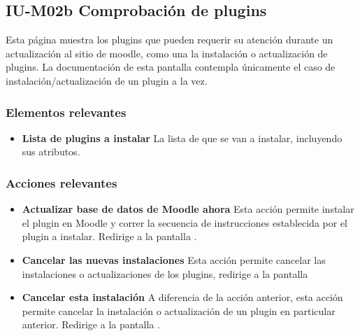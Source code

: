 
\subsection{IU-M02b Comprobación de plugins}

 Esta página muestra los plugins que pueden requerir su atención durante un actualización al sitio
 de moodle, como una la instalación o actualización de plugins. La documentación de esta pantalla
 contempla únicamente el caso de instalación/actualización de un plugin a la vez.


\subsubsection{Elementos relevantes}

   \begin{itemize}
   \item {\bf Lista de plugins a instalar}
        La lista de  que se van a instalar, incluyendo
        sus atributos.
   \end{itemize}

\subsubsection{Acciones relevantes}

    \begin{itemize}
    \item {\bf Actualizar base de datos de Moodle ahora}
        Esta acción permite instalar el plugin en Moodle y correr la secuencia de
        instrucciones establecida por el plugin a instalar. Redirige a la pantalla
        .

    \item {\bf Cancelar las nuevas instalaciones}
        Esta acción permite cancelar las instalaciones o actualizaciones de los plugins,
        redirige a la pantalla 

    \item {\bf Cancelar esta instalación}
        A diferencia de la acción anterior, esta acción permite cancelar la instalación
        o actualización de un plugin en particular anterior. Redirige a la pantalla
        .
    \end{itemize}

\clearpage
